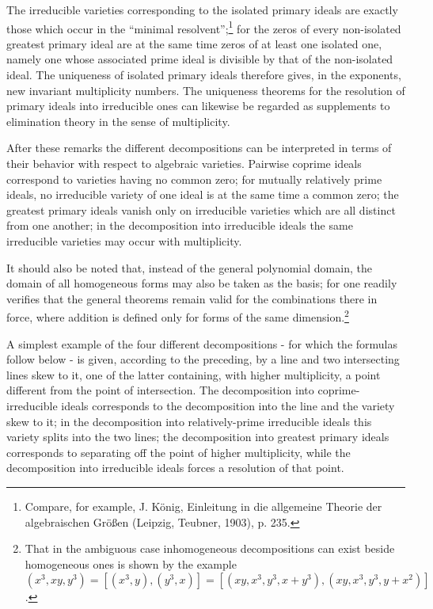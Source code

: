 \documentclass[11pt]{article}
\begin{document}
The irreducible varieties corresponding to the isolated primary ideals are exactly those which occur in the ``minimal resolvent'';\footnote{Compare, for example, J. König, Einleitung in die allgemeine Theorie der algebraischen Größen (Leipzig, Teubner, 1903), p. 235.} for the zeros of every non-isolated greatest primary ideal are at the same time zeros of at least one isolated one, namely one whose associated prime ideal is divisible by that of the non-isolated ideal. The uniqueness of isolated primary ideals therefore gives, in the exponents, new invariant multiplicity numbers. The uniqueness theorems for the resolution of primary ideals into irreducible ones can likewise be regarded as supplements to elimination theory in the sense of multiplicity.

After these remarks the different decompositions can be interpreted in terms of their behavior with respect to algebraic varieties. Pairwise coprime ideals correspond to varieties having no common zero; for mutually relatively prime ideals, no irreducible variety of one ideal is at the same time a common zero; the greatest primary ideals vanish only on irreducible varieties which are all distinct from one another; in the decomposition into irreducible ideals the same irreducible varieties may occur with multiplicity.

It should also be noted that, instead of the general polynomial domain, the domain of all homogeneous forms may also be taken as the basis; for one readily verifies that the general theorems remain valid for the combinations there in force, where addition is defined only for forms of the same dimension.\footnote{That in the ambiguous case inhomogeneous decompositions can exist beside homogeneous ones is shown by the example $(x^3,xy,y^3)=[(x^3,y),(y^3,x)]=[(xy,x^3,y^3,x+y^3),(xy,x^3,y^3,y+x^2)]$.}

A simplest example of the four different decompositions - for which the formulas follow below - is given, according to the preceding, by a line and two intersecting lines skew to it, one of the latter containing, with higher multiplicity, a point different from the point of intersection. The decomposition into coprime-irreducible ideals corresponds to the decomposition into the line and the variety skew to it; in the decomposition into relatively-prime irreducible ideals this variety splits into the two lines; the decomposition into greatest primary ideals corresponds to separating off the point of higher multiplicity, while the decomposition into irreducible ideals forces a resolution of that point.
\end{document}
